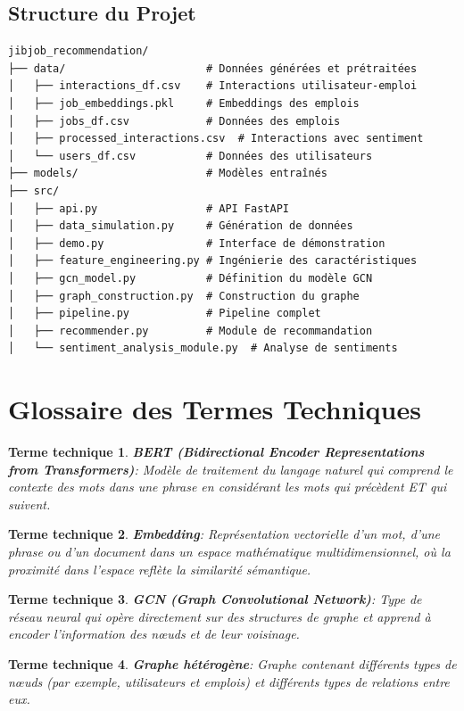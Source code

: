 \documentclass[12pt,a4paper]{article}
\newtheorem*{term}{Terme technique}
\begin{document}
\subsection{Structure du Projet}
\begin{verbatim}
jibjob_recommendation/
├── data/                      # Données générées et prétraitées
│   ├── interactions_df.csv    # Interactions utilisateur-emploi
│   ├── job_embeddings.pkl     # Embeddings des emplois
│   ├── jobs_df.csv            # Données des emplois
│   ├── processed_interactions.csv  # Interactions avec sentiment
│   └── users_df.csv           # Données des utilisateurs
├── models/                    # Modèles entraînés
├── src/
│   ├── api.py                 # API FastAPI
│   ├── data_simulation.py     # Génération de données
│   ├── demo.py                # Interface de démonstration
│   ├── feature_engineering.py # Ingénierie des caractéristiques
│   ├── gcn_model.py           # Définition du modèle GCN
│   ├── graph_construction.py  # Construction du graphe
│   ├── pipeline.py            # Pipeline complet
│   ├── recommender.py         # Module de recommandation
│   └── sentiment_analysis_module.py  # Analyse de sentiments
\end{verbatim}

\section{Glossaire des Termes Techniques}

\begin{term}
\textbf{BERT (Bidirectional Encoder Representations from Transformers)}: Modèle de traitement du langage naturel qui comprend le contexte des mots dans une phrase en considérant les mots qui précèdent ET qui suivent.
\end{term}

\begin{term}
\textbf{Embedding}: Représentation vectorielle d'un mot, d'une phrase ou d'un document dans un espace mathématique multidimensionnel, où la proximité dans l'espace reflète la similarité sémantique.
\end{term}

\begin{term}
\textbf{GCN (Graph Convolutional Network)}: Type de réseau neural qui opère directement sur des structures de graphe et apprend à encoder l'information des nœuds et de leur voisinage.
\end{term}

\begin{term}
\textbf{Graphe hétérogène}: Graphe contenant différents types de nœuds (par exemple, utilisateurs et emplois) et différents types de relations entre eux.
\end{term}
\end{document}
